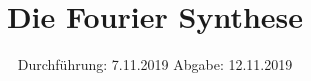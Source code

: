 

\subject{Versuchsnummer: 802}
\title{Die Fourier Synthese}
\date{%
  Durchführung: 7.11.2019
  \hspace{3em}
  Abgabe: 12.11.2019
}



\maketitle
\thispagestyle{empty}
\tableofcontents
\newpage






\printbibliography{}


